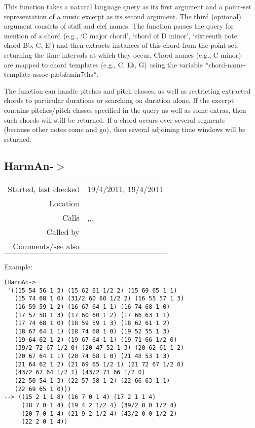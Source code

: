 \noindent This function takes a natural language query
as its first argument and a point-set representation of
a music excerpt as its second argument. The third
(optional) argument consists of staff and clef names.
The function parses the query for mention of a chord
(e.g., `C major chord', `chord of D minor',
`sixteenth note chord Bb, C, E') and then extracts
instances of this chord from the point set, returning
the time intervals at which they occur. Chord names 
(e.g., C minor) are mapped to chord templates (e.g., C,
E$\flat$, G) using the variable
*chord-name-template-assoc-p\&b\&min7ths*.

The function can handle pitches and pitch classes, as
well as restricting extracted chords to particular
durations or searching on duration alone. If the
excerpt contains pitches/pitch classes specified in the
query as well as some extras, then such chords will
still be returned. If a chord occurs over several
segments (because other notes come and go), then
several adjoining time windows will be returned.


\subsection*{HarmAn-$>$}\label{fun:HarmAn->}

\vspace{0.3cm}
\begin{tabular}{r|p{8cm}}
Started, last checked & 19/4/2011, 19/4/2011 \\
Location & \nameref{sec:chord-labelling} \\
Calls & \nameref{fun:HarmAn->labelling},\newline \nameref{fun:labelled-listed-segments2datapoints},\newline \nameref{fun:resolve-dim7s}, \nameref{fun:segments-strict} \\
Called by & \nameref{fun:labelled-listed-segments2datapoints} \\
Comments/see also &
\end{tabular}

\vspace{0.5cm}
\noindent Example:
\begin{verbatim}
(HarmAn->
 '((15 54 56 1 3) (15 62 61 1/2 2) (15 69 65 1 1)
   (15 74 68 1 0) (31/2 60 60 1/2 2) (16 55 57 1 3)
   (16 59 59 1 2) (16 67 64 1 1) (16 74 68 1 0)
   (17 57 58 1 3) (17 60 60 1 2) (17 66 63 1 1)
   (17 74 68 1 0) (18 59 59 1 3) (18 62 61 1 2)
   (18 67 64 1 1) (18 74 68 1 0) (19 52 55 1 3)
   (19 64 62 1 2) (19 67 64 1 1) (19 71 66 1/2 0)
   (39/2 72 67 1/2 0) (20 47 52 1 3) (20 62 61 1 2)
   (20 67 64 1 1) (20 74 68 1 0) (21 48 53 1 3)
   (21 64 62 1 2) (21 69 65 1/2 1) (21 72 67 1/2 0)
   (43/2 67 64 1/2 1) (43/2 71 66 1/2 0)
   (22 50 54 1 3) (22 57 58 1 2) (22 66 63 1 1)
   (22 69 65 1 0)))
--> ((15 2 1 1 8) (16 7 0 1 4) (17 2 1 1 4)
     (18 7 0 1 4) (19 4 2 1/2 4) (39/2 0 0 1/2 4)
     (20 7 0 1 4) (21 9 2 1/2 4) (43/2 0 0 1/2 2)
     (22 2 0 1 4))
\end{verbatim}

